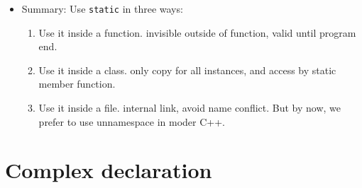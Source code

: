 \documentclass[a4paper,11pt,twoside]{book}
\begin{document}
\begin{itemize}
	
	\item Summary: Use \texttt{static} in three ways:
	\begin{enumerate}
		\item Use it inside a function. invisible outside of function, valid until program end.
		
		\item Use it inside a class. only copy for all instances, and access by static member function.
		
		\item Use it inside a file. internal link, avoid name conflict. But by now, we prefer to use unnamespace in moder C++.
	\end{enumerate}
\end{itemize}


\section{Complex declaration}
\end{document}
